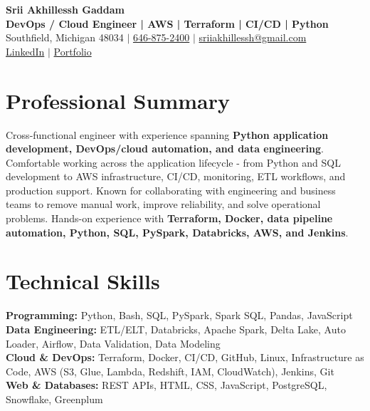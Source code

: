 \documentclass[letterpaper,10pt]{article}
\begin{document}
\fontsize{9.35pt}{10.45pt}\selectfont

\begin{center}
    {\LARGE \textbf{Srii Akhillessh Gaddam}} \\[-1pt]
    \textbf{DevOps / Cloud Engineer | AWS | Terraform | CI/CD | Python} \\[2pt]
    Southfield, Michigan 48034 $|$
    \href{tel:6468752400}{646-875-2400} $|$
    \href{mailto:sriiakhillessh@gmail.com}{sriiakhillessh@gmail.com} \\[1pt]
    \href{https://www.linkedin.com/in/srii-akhiilessh-gaddam-b48668191/}{LinkedIn} $|$
    \href{https://sriiakhillesshg.github.io/portfolio/}{Portfolio}
\end{center}
\vspace{-8pt}

\section{Professional Summary}
\small{Cross-functional engineer with experience spanning \textbf{Python application development, DevOps/cloud automation, and data engineering}. Comfortable working across the application lifecycle - from Python and SQL development to AWS infrastructure, CI/CD, monitoring, ETL workflows, and production support. Known for collaborating with engineering and business teams to remove manual work, improve reliability, and solve operational problems. Hands-on experience with \textbf{Terraform, Docker, data pipeline automation, Python, SQL, PySpark, Databricks, AWS, and Jenkins}.}

\section{Technical Skills}
\small{
\textbf{Programming:} Python, Bash, SQL, PySpark, Spark SQL, Pandas, JavaScript \\
\textbf{Data Engineering:} ETL/ELT, Databricks, Apache Spark, Delta Lake, Auto Loader, Airflow, Data Validation, Data Modeling \\
\textbf{Cloud \& DevOps:} Terraform, Docker, CI/CD, GitHub, Linux, Infrastructure as Code, AWS (S3, Glue, Lambda, Redshift, IAM, CloudWatch), Jenkins, Git \\
\textbf{Web \& Databases:} REST APIs, HTML, CSS, JavaScript, PostgreSQL, Snowflake, Greenplum
}
\end{document}
